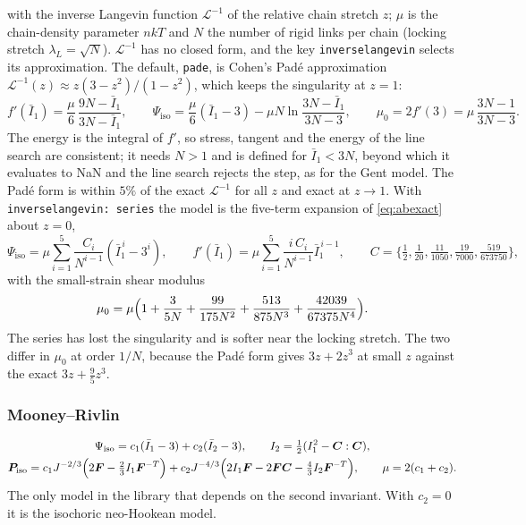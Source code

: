 \documentclass[11pt]{article}
\newcommand{\bP}{\bm{P}}
\newcommand{\bF}{\bm{F}}
\newcommand{\bC}{\bm{C}}
\newcommand{\Ione}{I_1}
\newcommand{\Itwo}{I_2}
\newcommand{\Ib}{\bar{I}_1}
\newcommand{\IIb}{\bar{I}_2}
\DeclareRobustCommand{\code}[1]{{\def\_{\textunderscore\allowbreak}\texttt{#1}}}
\begin{document}
with the inverse Langevin function $\mathcal{L}^{-1}$ of the relative
chain stretch $z$; $\mu$ is the chain-density parameter $nkT$ and $N$ the
number of rigid links per chain (locking stretch $\lambda_L = \sqrt N$).
$\mathcal{L}^{-1}$ has no closed form, and the key
\code{inverse\_langevin} selects its approximation.  The default,
\code{pade}, is Cohen's Pad\'e approximation~\cite{cohen}
$\mathcal{L}^{-1}(z) \approx z(3 - z^2)/(1 - z^2)$, which keeps the
singularity at $z = 1$:
\begin{equation}
  f'(\Ib) = \frac{\mu}{6}\,\frac{9N - \Ib}{3N - \Ib}, \qquad
  \Psi_{\mathrm{iso}} = \frac{\mu}{6}(\Ib - 3) - \mu N\ln\frac{3N - \Ib}{3N - 3}, \qquad
  \mu_0 = 2f'(3) = \mu\,\frac{3N - 1}{3N - 3}.
  \label{eq:abpade}
\end{equation}
The energy is the integral of $f'$, so stress, tangent and the energy of
the line search are consistent; it needs $N > 1$ and is defined for
$\Ib < 3N$, beyond which it evaluates to NaN and the line search rejects
the step, as for the Gent model.  The Pad\'e form is within $5\%$ of the
exact $\mathcal{L}^{-1}$ for all $z$ and exact at $z \to 1$.  With
\code{inverse\_langevin: series} the model is the five-term expansion of
\eqref{eq:abexact} about $z = 0$,
\begin{equation}
  \Psi_{\mathrm{iso}} = \mu\sum_{i=1}^5\frac{C_i}{N^{i-1}}(\Ib^{\,i} - 3^i), \qquad
  f'(\Ib) = \mu\sum_{i=1}^5\frac{i\,C_i}{N^{i-1}}\Ib^{\,i-1}, \qquad
  C = \{\tfrac12, \tfrac1{20}, \tfrac{11}{1050}, \tfrac{19}{7000}, \tfrac{519}{673750}\},
  \label{eq:abseries}
\end{equation}
with the small-strain shear modulus
\begin{equation}
  \mu_0 = \mu\Bigl(1 + \frac{3}{5N} + \frac{99}{175N^2} + \frac{513}{875N^3} + \frac{42039}{67375N^4}\Bigr).
  \label{eq:abmu0}
\end{equation}
The series has lost the singularity and is softer near the locking
stretch.  The two differ in $\mu_0$ at order $1/N$, because the Pad\'e form
gives $3z + 2z^3$ at small $z$ against the exact $3z + \tfrac95 z^3$.

\subsubsection{Mooney--Rivlin}

\begin{gather}
  \Psi_{\mathrm{iso}} = c_1(\Ib - 3) + c_2(\IIb - 3), \qquad
  \Itwo = \tfrac12(\Ione^2 - \bC:\bC), \\
  \bP_{\mathrm{iso}}
  = c_1 J^{-2/3}\Bigl(2\bF - \tfrac23\Ione\bF^{-T}\Bigr)
  + c_2 J^{-4/3}\Bigl(2\Ione\bF - 2\bF\bC - \tfrac43\Itwo\bF^{-T}\Bigr),
  \qquad \mu = 2(c_1 + c_2).
\end{gather}
The only model in the library that depends on the second invariant.  With
$c_2 = 0$ it is the isochoric neo-Hookean model.
\end{document}
